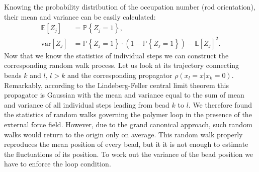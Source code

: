 \documentclass[aps,showpacs,twocolumn,floatfix,prx,superscriptaddress]{revtex4-1}
\begin{document}
Knowing the probability distribution of the occupation number (rod orientation), their mean
and variance can be easily
calculated:
\begin{subequations}
    \begin{align}
        \label{eq:zmean}
        \mathbb{E}\left[Z_j\right] & =  \mathbb{P} \left\{ Z_j = 1\right\} ,\\
        \label{eq:zvar}
        \text{var}\left[Z_j\right] & = \mathbb{P} \left\{ Z_j = 1\right\} \cdot
        \left( 1 - \mathbb{P} \left\{ Z_j = 1\right\} \right) -
        \mathbb{E}\left[Z_j\right]^2.
    \end{align}
\end{subequations}
Now that we know the statistics of individual steps we can construct the corresponding random walk process. Let us look at its trajectory connecting beads $k$ and $l$, $l>k$ and the corresponding propagator $\rho(x_l=x|x_k=0)$. Remarkably, according to the Lindeberg-Feller central limit theorem \cite{} this propagator is  Gaussian with the mean and variance equal to the sum of mean and variance of all individual steps leading from bead $k$ to $l$. We therefore found the statistics of random walks governing the polymer loop in the presence of the external force field. However, due to the grand canonical approach, such random walks would return to the origin only on average. This random walk properly reproduces the mean position of every bead, but it it is not enough to estimate the fluctuations of its position. To work out the variance of the bead position we have to enforce the loop condition.
 
\end{document}
